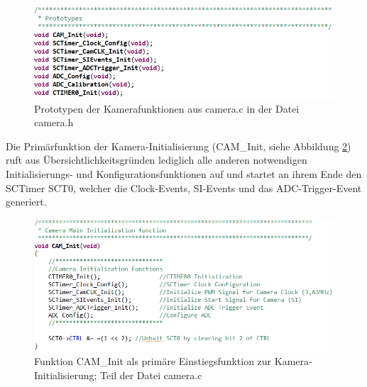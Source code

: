 \begin{figure}[H] %
\includegraphics[width=.95\textwidth]{sec7/images/code/camerah} 
\centering
\captionsetup{width=.95\textwidth}
\caption[Prototypen der Kamerafunktionen in der Datei \glqq{}camera.h\grqq{}]{Prototypen der Kamerafunktionen aus \glqq{}camera.c\grqq{} in der Datei \glqq{}camera.h\grqq{}}\centering
\label{fig:camh}
\end{figure}


Die Primärfunktion der Kamera-Initialisierung (\glqq{}CAM\_Init\grqq{}, siehe Abbildung \ref{fig:CAMInit}) ruft aus Übersichtlichkeitsgründen lediglich alle anderen notwendigen Initialisierungs- und Konfigurationsfunktionen auf und startet an ihrem Ende den SCTimer SCT0, welcher die Clock-Events, SI-Events und das ADC-Trigger-Event generiert.

\begin{figure}[H] %
\includegraphics[width=.95\textwidth]{sec7/images/code/CAMInit} 
\centering
\captionsetup{width=.95\textwidth}
\caption[Funktion \glqq{}CAM\_Init\grqq{} aus der Datei \glqq{}camera.c\grqq{}]{Funktion \glqq{}CAM\_Init\grqq{} als primäre Einstiegsfunktion zur Kamera-Initialisierung; Teil der Datei \glqq{}camera.c\grqq{}}\centering
\label{fig:CAMInit}
\end{figure}

